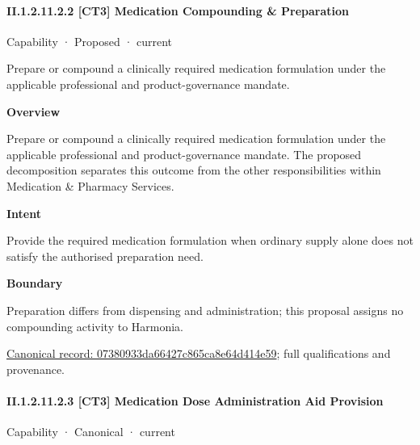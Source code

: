 \paragraph*{II.1.2.11.2.2 [CT3] Medication Compounding \& Preparation}
\label{navigation:II.1.2.11.2.2}

\label{element:07380933da66427c865ca8e64d414e59}
{\small Capability · Proposed · current}\par

Prepare or compound a clinically required medication formulation under the applicable professional and product-governance mandate.



\textbf{Overview}



Prepare or compound a clinically required medication formulation under the applicable professional and product-governance mandate. The proposed decomposition separates this outcome from the other responsibilities within Medication \& Pharmacy Services.



\textbf{Intent}



Provide the required medication formulation when ordinary supply alone does not satisfy the authorised preparation need.



\textbf{Boundary}



Preparation differs from dispensing and administration; this proposal assigns no compounding activity to Harmonia.


{\footnotesize \href{../../../../continuum/strategy/capability/07380933da66427c865ca8e64d414e59.md}{Canonical record: 07380933da66427c865ca8e64d414e59}; full qualifications and provenance.}\par
\paragraph*{II.1.2.11.2.3 [CT3] Medication Dose Administration Aid Provision}
\label{navigation:II.1.2.11.2.3}

\label{element:bd597608766b4d709703977c02cc5f07}
{\small Capability · Canonical · current}\par

